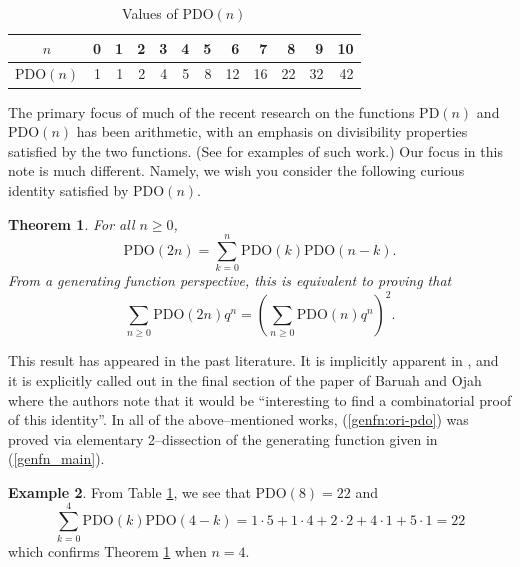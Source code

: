 \documentclass[11pt,reqno]{amsart}
\numberwithin{equation}{section}
\theoremstyle{plain}
\newtheorem{theorem}{Theorem}[section]
\theoremstyle{definition}
\newtheorem{example}[theorem]{Example}
\theoremstyle{named}
\def\PD{\mathrm{PD}}
\def\PDO{\mathrm{PDO}}
\begin{document}
\begin{center}
\begin{table}
\begin{tabular}{ |c| *{11}{r|} }
\hline 
$n$  & 0 & 1 & 2 & 3 & 4 & 5 & 6 & 7 & 8 & 9 & 10 \\
\hline
$\PDO(n)$ & 1 & 1 & 2 & 4 & 5 & 8 & 12 & 16 & 22 & 32 & 42 \\
\hline 
\end{tabular}
\caption{Values of $\PDO(n)$} \label{table-PDO-values}
\end{table}
\end{center}


The primary focus of much of the recent research on the functions $\PD(n)$ and $\PDO(n)$ has been arithmetic, with an emphasis on divisibility properties satisfied by the two functions.  
(See \cite{ALL02, BO15, CJJS, CS24, Her23, HBN17, sel24, Xia16} for examples of such work.)  Our focus in this note is much different.  Namely, we wish you consider the following curious identity satisfied by $\PDO(n)$.

\begin{theorem}
\label{id:ori-pdo}  
 For all $n\geq 0$,
\begin{equation*}
\PDO(2n)=\sum_{k=0}^{n}\PDO(k)\PDO(n-k).
\end{equation*}
From a generating function perspective, this is equivalent to proving that 
\begin{equation}
\label{genfn:ori-pdo}
\sum_{n\geq 0} \PDO(2n)q^n = \left( \sum_{n\geq 0} \PDO(n)q^n \right)^2. 
\end{equation}
\end{theorem}
This result has appeared in the past literature.  It is implicitly apparent in \cite{ALL02, sel24}, and it is explicitly called out in the final section of the paper of Baruah and Ojah \cite{BO15} where the authors note that it would be  ``interesting to find a combinatorial proof of this identity''.  In all of the above--mentioned works,  (\ref{genfn:ori-pdo}) was proved via elementary 2--dissection of the generating function given in (\ref{genfn_main}).   

\begin{example}
From Table \ref{table-PDO-values}, we see that $\PDO(8) = 22$ and 
$$
\sum_{k=0}^{4}\PDO(k)\PDO(4-k) = 1\cdot 5 + 1\cdot 4 + 2\cdot 2 + 4\cdot 1 + 5 \cdot 1 = 22
$$ 
which confirms Theorem \ref{id:ori-pdo} when $n=4$.  
\end{example} 
\end{document}
